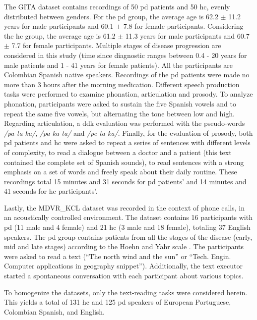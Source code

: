 The GITA dataset contains recordings of 50 \gls{pd} patients and 50 \gls{hc}, evenly distributed between genders. For the \gls{pd} group, the average age is 62.2 $\pm$ 11.2 years for male participants and 60.1 $\pm$ 7.8 for female participants. Considering the \gls{hc} group, the average age is 61.2 $\pm$ 11.3 years for male participants and 60.7 $\pm$ 7.7 for female participants. Multiple stages of disease progression are considered in this study (time since diagnostic ranges between 0.4 - 20 years for male patients and 1 - 41 years for female patients). All the participants are Colombian Spanish native speakers. Recordings of the \gls{pd} patients were made no more than 3 hours after the morning medication. Different speech production tasks were performed to examine phonation, articulation and prosody. To analyze phonation, participants were asked to sustain the five Spanish vowels and to repeat the same five vowels, but alternating the tone between low and high. Regarding articulation, a \gls{ddk} evaluation was performed with the pseudo-words \textit{/pa-ta-ka/}, \textit{/pa-ka-ta/} and \textit{/pe-ta-ka/}. Finally, for the evaluation of prosody, both \gls{pd} patients and \gls{hc} were asked to repeat a series of sentences with different levels of complexity, to read a dialogue between a doctor and a patient (this text contained the complete set of Spanish sounds), to read sentences with a strong emphasis on a set of words and freely speak about their daily routine. These recordings total 15 minutes and 31 seconds for \gls{pd} patients' and 14 minutes and 41 seconds for \gls{hc} participants'.

Lastly, the MDVR\_KCL dataset was recorded in the context of phone calls, in an acoustically controlled environment. The dataset contains 16 participants with \gls{pd} (11 male and 4 female) and 21 \gls{hc} (3 male and 18 female), totaling 37 English speakers. The \gls{pd} group contains patients from all the stages of the disease (early, mid and late stages) according to the  Hoehn and Yahr scale \cite{hoehn_yahr}. The participants were asked to read a text (``The north wind and the sun'' or ``Tech. Engin. Computer applications in geography snippet''). Additionally, the text executor started a spontaneous conversation with each participant about various topics.

To homogenize the datasets, only the text-reading tasks were considered herein. This yields a total of 131 \gls{hc} and 125 \gls{pd} speakers of European Portuguese, Colombian Spanish, and English. 

